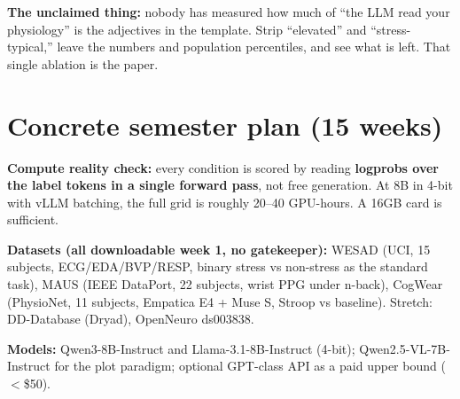 \documentclass[11pt]{article}
\begin{document}
\textbf{The unclaimed thing:} nobody has measured how much of ``the LLM read
your physiology'' is the adjectives in the template. Strip ``elevated'' and
``stress-typical,'' leave the numbers and population percentiles, and see what
is left. That single ablation is the paper.

\section{Concrete semester plan (15 weeks)}

\textbf{Compute reality check:} every condition is scored by reading
\textbf{logprobs over the label tokens in a single forward pass}, not free
generation. At 8B in 4-bit with vLLM batching, the full grid is roughly
20--40 GPU-hours. A 16GB card is sufficient.

\textbf{Datasets (all downloadable week 1, no gatekeeper):} WESAD (UCI, 15
subjects, ECG\slash EDA\slash BVP\slash RESP, binary stress vs non-stress as
the standard task),
MAUS (IEEE DataPort, 22 subjects, wrist PPG under n-back), CogWear (PhysioNet,
11 subjects, Empatica E4 + Muse S, Stroop vs baseline). Stretch: DD-Database
(Dryad), OpenNeuro ds003838.

\textbf{Models:} Qwen3-8B-Instruct and Llama-3.1-8B-Instruct (4-bit);
Qwen2.5-VL-7B-Instruct for the plot paradigm; optional GPT-class API as a paid
upper bound ($<$\$50).
\end{document}
